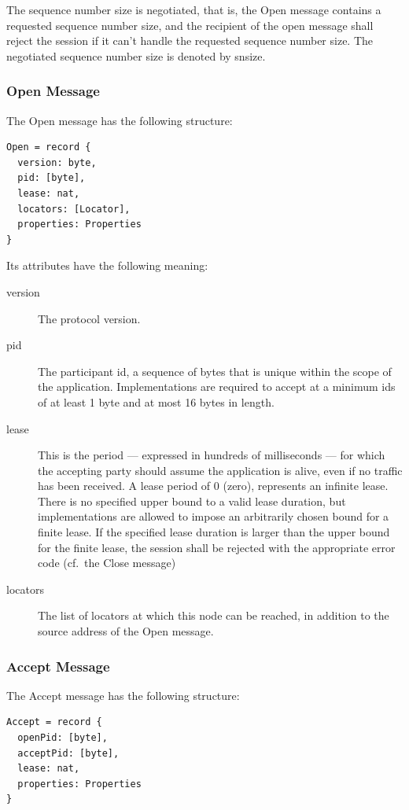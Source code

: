 \documentclass[a4paper,oneside,article]{memoir}
\begin{document}
The sequence number size is negotiated, that is, the Open message contains a requested sequence
number size, and the recipient of the open message shall reject the session if it can’t handle the
requested sequence number size.  The negotiated sequence number size is denoted by snsize.

\subsubsection{Open Message}

The Open message has the following structure:
\begin{verbatim}
Open = record {
  version: byte,
  pid: [byte],
  lease: nat,
  locators: [Locator],
  properties: Properties
}  
\end{verbatim}

Its attributes have the following meaning:
\begin{description}
\item[version] The protocol version.
\item[pid] The participant id, a sequence of bytes that is unique within the scope of the
  application.  Implementations are required to accept at a minimum ids of at least 1 byte and at
  most 16 bytes in length.
\item[lease] This is the period --- expressed in hundreds of milliseconds --- for which the accepting
  party should assume the application is alive, even if no traffic has been received. A lease period
  of 0 (zero), represents an infinite lease.  There is no specified upper bound to a valid lease
  duration, but implementations are allowed to impose an arbitrarily chosen bound for a finite
  lease.  If the specified lease duration is larger than the upper bound for the finite lease, the
  session shall be rejected with the appropriate error code (cf.\  the Close message)
\item[locators] The list of locators at which this node can be reached, in addition to the source
  address of the Open message.
\end{description}

\subsubsection{Accept Message}

The Accept message has the following structure:
\begin{verbatim}
Accept = record {
  openPid: [byte],
  acceptPid: [byte],
  lease: nat,
  properties: Properties
}  
\end{verbatim}
\end{document}
